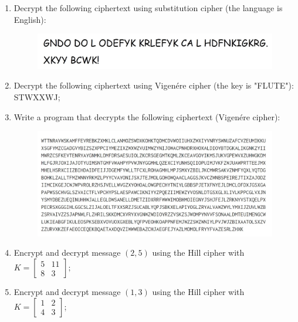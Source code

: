 \begin{enumerate}
    \item Decrypt the following ciphertext using substitution cipher (the language is English):

    \begin{figure}[h!]
        \centering
        \includegraphics[scale = 0.41]{img/ex1.jpg}
        \label{ex1}
    \end{figure}

    \item Decrypt the following ciphertext using Vigenére cipher (the key is "FLUTE"): STWXXWJ;

    \item Write a program that decrypts the following ciphertext (Vigenére cipher):

    \begin{figure}[h!]
        \centering
        \includegraphics[scale = 0.7]{img/ex3.jpg}
        \label{ex3}
    \end{figure}
    
    \item Encrypt and decrypt message $(2,5)$ using the Hill cipher with $K =  \begin{bmatrix}
5 & 11 \\
8 & 3 
\end{bmatrix};$

    \item Encrypt and decrypt message $(1,3)$ using the Hill cipher with $K = \begin{bmatrix}
1 & 2 \\
4 & 3 
\end{bmatrix}$;


\end{enumerate}
